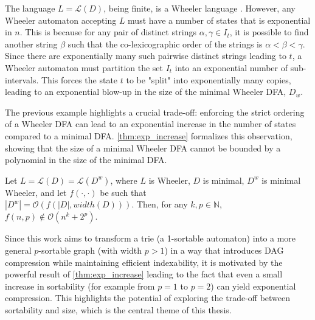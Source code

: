 \begin{example}
    The language $L = \mathcal{L}(D)$, being finite, is a Wheeler language \cite{alanko2021wheeler}. However, any Wheeler automaton accepting $L$ must have a number of states that is exponential in $n$. This is because for any pair of distinct strings $\alpha, \gamma \in I_t$, it is possible to find another string $\beta$ such that the co-lexicographic order of the strings is $\alpha < \beta < \gamma$. Since there are exponentially many such pairwise distinct strings leading to $t$, a Wheeler automaton must partition the set $I_t$ into an exponential number of sub-intervals. This forces the state $t$ to be "split" into exponentially many copies, leading to an exponential blow-up in the size of the minimal Wheeler DFA, $D_w$.
\end{example}

The previous example highlights a crucial trade-off: enforcing the strict ordering of a Wheeler DFA can lead to an exponential increase in the number of states compared to a minimal DFA. \cref{thm:exp_increase} formalizes this observation, showing that the size of a minimal Wheeler DFA cannot be bounded by a polynomial in the size of the minimal DFA.
\begin{theorem} \label{thm:exp_increase}
    Let $L = \mathcal{L}(D) = \mathcal{L}(D^w)$, where $L$ is Wheeler, $D$ is minimal, $D^w$ is minimal Wheeler, and let $f(\cdot,\cdot)$ be such that \\
    $|D^w| = \mathcal{O}(f(|D|,width(D)))$. Then, for any $k,p \in \mathbb{N}$, $f(n,p) \notin \mathcal{O}(n^k + 2^p)$.
\end{theorem}

Since this work aims to transform a trie (a 1-sortable automaton) into a more general $p$-sortable graph (with width $p>1$) in a way that introduces DAG compression while maintaining efficient indexability, it is motivated by the powerful result of \cref{thm:exp_increase} leading to the fact that even a small increase in sortability (for example from $p=1$ to $p=2$) can yield exponential compression. This highlights the potential of exploring the trade-off between sortability and size, which is the central theme of this thesis.

